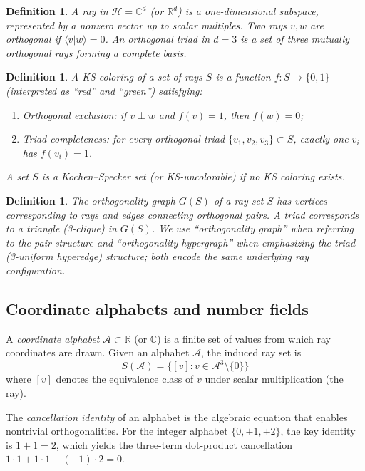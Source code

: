 \documentclass[12pt,a4paper]{article}
\newtheorem{definition}[theorem]{Definition}
\newcommand{\R}{\mathbb{R}}
\newcommand{\C}{\mathbb{C}}
\newcommand{\braket}[2]{\langle#1|#2\rangle}
\begin{document}
\begin{definition}
A \emph{ray} in $\mathcal{H} = \C^d$ (or $\R^d$) is a one-dimensional subspace, represented by a nonzero vector up to scalar multiples. Two rays $v, w$ are \emph{orthogonal} if $\braket{v}{w} = 0$. An \emph{orthogonal triad} in $d = 3$ is a set of three mutually orthogonal rays forming a complete basis.
\end{definition}

\begin{definition}
A \emph{KS coloring} of a set of rays $S$ is a function $f: S \to \{0, 1\}$ (interpreted as ``red'' and ``green'') satisfying:
\begin{enumerate}[label=(\alph*)]
    \item \emph{Orthogonal exclusion}: if $v \perp w$ and $f(v) = 1$, then $f(w) = 0$;
    \item \emph{Triad completeness}: for every orthogonal triad $\{v_1, v_2, v_3\} \subset S$, exactly one $v_i$ has $f(v_i) = 1$.
\end{enumerate}
A set $S$ is a \emph{Kochen--Specker set} (or \emph{KS-uncolorable}) if no KS coloring exists.
\end{definition}

\begin{definition}
The \emph{orthogonality graph} $G(S)$ of a ray set $S$ has vertices corresponding to rays and edges connecting orthogonal pairs. A \emph{triad} corresponds to a triangle (3-clique) in $G(S)$. We use ``orthogonality graph'' when referring to the pair structure and ``orthogonality hypergraph'' when emphasizing the triad (3-uniform hyperedge) structure; both encode the same underlying ray configuration.
\end{definition}

\subsection{Coordinate alphabets and number fields}

A \emph{coordinate alphabet} $\mathcal{A} \subset \R$ (or $\C$) is a finite set of values from which ray coordinates are drawn. Given an alphabet $\mathcal{A}$, the induced ray set is
\[
S(\mathcal{A}) = \{ [v] : v \in \mathcal{A}^3 \setminus \{0\} \}
\]
where $[v]$ denotes the equivalence class of $v$ under scalar multiplication (the ray).

The \emph{cancellation identity} of an alphabet is the algebraic equation that enables nontrivial orthogonalities. For the integer alphabet $\{0, \pm 1, \pm 2\}$, the key identity is $1 + 1 = 2$, which yields the three-term dot-product cancellation $1 \cdot 1 + 1 \cdot 1 + (-1) \cdot 2 = 0$.
\end{document}

